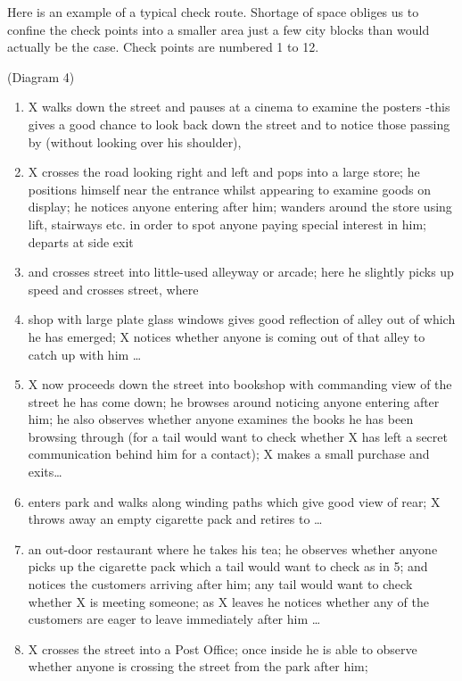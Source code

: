 Here is an example of a typical check route. Shortage of space obliges
us to confine the check points into a smaller area just a few city
blocks than would actually be the case. Check points are numbered 1 to
12.

(Diagram 4)

\begin{enumerate}
\tightlist
\item
  X walks down the street and pauses at a cinema to examine the posters
  -this gives a good chance to look back down the street and to notice
  those passing by (without looking over his shoulder),
\item
  X crosses the road looking right and left and pops into a large store;
  he positions himself near the entrance whilst appearing to examine
  goods on display; he notices anyone entering after him; wanders around
  the store using lift, stairways etc. in order to spot anyone paying
  special interest in him; departs at side exit
\item
  and crosses street into little-used alleyway or arcade; here he
  slightly picks up speed and crosses street, where
\item
  shop with large plate glass windows gives good reflection of alley out
  of which he has emerged; X notices whether anyone is coming out of
  that alley to catch up with him \ldots{}
\item
  X now proceeds down the street into bookshop with commanding view of
  the street he has come down; he browses around noticing anyone
  entering after him; he also observes whether anyone examines the books
  he has been browsing through (for a tail would want to check whether X
  has left a secret communication behind him for a contact); X makes a
  small purchase and exits\ldots{}
\item
  enters park and walks along winding paths which give good view of
  rear; X throws away an empty cigarette pack and retires to \ldots{}
\item
  an out-door restaurant where he takes his tea; he observes whether
  anyone picks up the cigarette pack which a tail would want to check as
  in 5; and notices the customers arriving after him; any tail would
  want to check whether X is meeting someone; as X leaves he notices
  whether any of the customers are eager to leave immediately after him
  \ldots{}
\item
  X crosses the street into a Post Office; once inside he is able to
  observe whether anyone is crossing the street from the park after him;

\end{enumerate}
